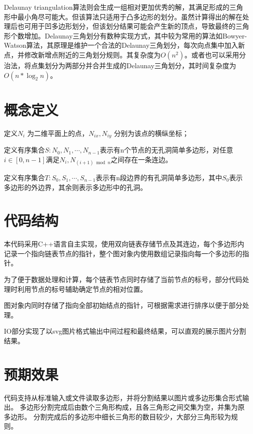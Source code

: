 Delaunay triangulation算法则会生成一组相对更加优秀的解，其满足形成的三角形中最小角尽可能大。但该算法只适用于凸多边形的划分。虽然计算得出的解在处理后也可用于凹多边形划分，但该划分结果可能会产生新的顶点，导致最终的三角形个数增加。Delaunay三角划分有数种实现方式，其中较为常用的算法如Bowyer-Watson算法，其原理是维护一个合法的Delaunay三角划分，每次向点集中加入新点，并修改新增点附近的三角划分规则。其复杂度为\(O(n^2)\)。或者也可以采用分治法，将点集划分为两部分并合并生成的Delaunay三角划分，其时间复杂度为\(O(n*\log_2n)\)。


\section{概念定义}

定义\(N_i\) 为二维平面上的点，\(N_{ix},N_{iy}\) 分别为该点的横纵坐标；

定义有序集合\(S:N_0,N_1,\cdots,N_{n-1}\)表示有n个节点的无孔洞简单多边形，对任意\(i\in [0,n-1] \)满足\(N_i,N_{(i+1) \bmod n}\)之间存在一条连边。

定义有序集合\(T:S_0,S_1,\cdots,S_{n-1}\)表示有n段边界的有孔洞简单多边形，其中\(S_0\)表示多边形的外边界，其余则表示多边形中的孔洞。

\section{代码结构}

本代码采用C++语言自主实现，使用双向链表存储节点及其连边，每个多边形内记录一个指向链表节点的指针，整个图对象内使用数组记录指向每一个多边形的指针。

为了便于数据处理和计算，每个链表节点同时存储了当前节点的标号，部分代码处理时利用节点的标号辅助确定节点的相对位置。

图对象内同时存储了指向全部初始结点的指针，可根据需求进行排序以便于部分处理。

IO部分实现了以svg图片格式输出中间过程和最终结果，可以直观的展示图片分割结果。

\section{预期效果}
代码支持从标准输入或文件读取多边形，并将分割结果以图片或多边形集合形式输出。
多边形分割完成后由数个三角形构成，且各三角形之间交集为空，并集为原多边形。
分割完成后的多边形中细长三角形的数目较少，大部分三角形较为规则。


